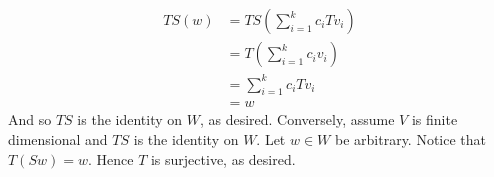\documentclass{book}
\begin{document}
\begin{enumerate}[label=\arabic*)]
      \begin{align*}
        TS(w) & = TS(\sum_{i = 1}^{k}c_iTv_i) \\
        & = T(\sum_{i = 1}^{k}c_iv_i) \\
        & = \sum_{i = 1}^{k}c_iTv_i \\
        & = w
      \end{align*}
      And so $TS$ is the identity on $W$, as desired. Conversely, assume $V$ is finite dimensional and $TS$ is the identity on $W$. Let $w \in W$ be arbitrary. Notice that $T(Sw) = w$. Hence
      $T$ is surjective, as desired.
    \ii



\end{enumerate}
\end{document}
